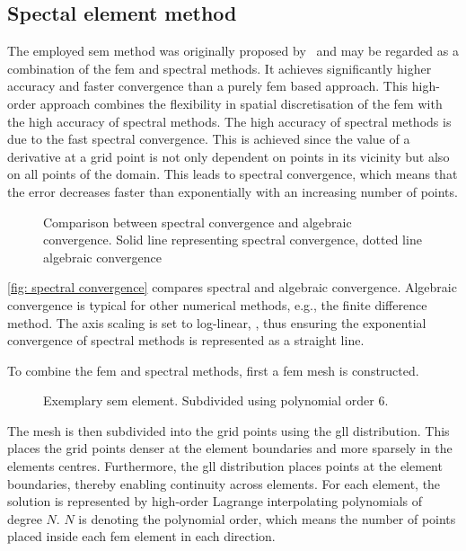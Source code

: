 \subsection{Spectal element method}
The employed \acrshort{sem} method was originally proposed by~\cite{pateraSpectralElementMethod1984} and  may be regarded as a combination of the \acrfull{fem} and spectral methods.
It achieves significantly higher accuracy and faster convergence than a purely \acrshort{fem} based approach. 
This high-order approach combines the flexibility in spatial discretisation of the \acrshort{fem}  with the high accuracy of spectral methods.
The high accuracy of spectral methods is due to the fast spectral convergence.
This is achieved since the  value of a derivative at a grid point is not only dependent on points in its vicinity but also on all points of the domain.
This leads to spectral convergence, which means that the error decreases faster than exponentially with an increasing number of points.
\begin{figure}
    \centering
    \caption{Comparison between spectral convergence and algebraic convergence. Solid line representing spectral convergence, dotted line algebraic convergence}
    \label{fig: spectral convergence}
\end{figure}

\autoref{fig: spectral convergence} compares spectral and algebraic convergence. 
Algebraic convergence is typical for other numerical methods, e.g., the finite difference method.
The axis scaling is set to log-linear, , thus ensuring the exponential convergence of spectral methods is represented as a straight line.

To combine the \acrshort{fem} and spectral methods, first a \acrshort{fem} mesh is constructed.
\begin{figure}
    \centering
    \caption{Exemplary \acrshort{sem} element. Subdivided using polynomial order 6.}
    \label{fig: SEM element}
\end{figure}


The mesh is then subdivided into the grid points using the \acrfull{gll} distribution.
This places the grid points denser at the element boundaries and more sparsely in the elements centres.
Furthermore, the \acrshort{gll} distribution places points at the element boundaries,  thereby enabling  continuity across elements.
For each element, the solution is represented by high-order Lagrange interpolating polynomials of degree $N$.
$N$ is denoting the polynomial order, which means the number of points placed inside each \acrshort{fem} element in each direction.

